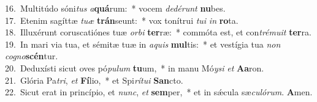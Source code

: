 {16.~}Multitúdo sóni\textit{tus} \textit{a}\textbf{quá}rum:~* vocem \textit{de}\textit{dé}\textit{runt} \textbf{nu}bes.\\
{17.~}Etenim sagíttæ \textit{tu}\textit{æ} \textbf{trán}seunt:~* vox tonítrui \textit{tu}\textit{i} \textit{in} \textbf{ro}ta.\\
{18.~}Illuxérunt coruscatiónes tuæ \textit{or}\textit{bi} \textbf{ter}ræ:~* commóta est, et con\textit{tré}\textit{mu}\textit{it} \textbf{ter}ra.\\
{19.~}In mari via tua, et sémitæ tuæ in \textit{a}\textit{quis} \textbf{mul}tis:~* et vestígia tua \textit{non} \textit{co}\textit{gno}\textbf{scén}tur.\\
{20.~}Deduxísti sicut oves pó\textit{pu}\textit{lum} \textbf{tu}um,~* in manu Mó\textit{y}\textit{si} \textit{et} \textbf{A}\textbf{a}ron.\\
{21.~}Glória Pa\textit{tri}, \textit{et} \textbf{Fí}lio,~* et Spi\textit{rí}\textit{tu}\textit{i} \textbf{San}cto.\\
{22.~}Sicut erat in princípio, et \textit{nunc}, \textit{et} \textbf{sem}per,~* et in sǽcula sæ\textit{cu}\textit{ló}\textit{rum}. \textbf{A}men.\\
